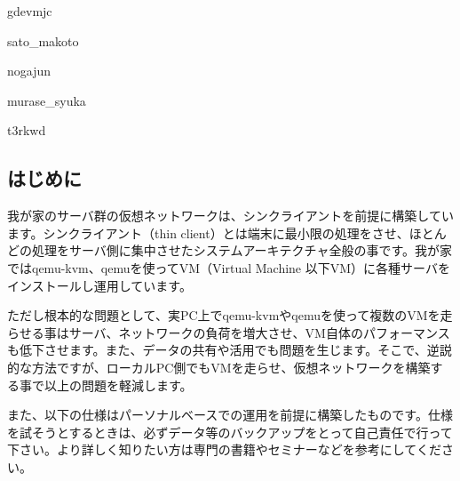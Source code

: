 \documentclass[mingoth,a4paper]{jsarticle}
\begin{document}
\begin{prework}{gdevmjc}
\end{prework}

\begin{prework}{sato\_makoto}
\end{prework}

\begin{prework}{nogajun}
\end{prework}

\begin{prework}{murase\_syuka}
\end{prework}

\begin{prework}{t3rkwd}
\end{prework}



\subsection{はじめに}
我が家のサーバ群の仮想ネットワークは、シンクライアントを前提に構築しています。シンクライアント（thin client）とは端末に最小限の処理をさせ、ほとんどの処理をサーバ側に集中させたシステムアーキテクチャ全般の事です。我が家ではqemu-kvm、qemuを使ってVM（Virtual Machine 以下VM）に各種サーバをインストールし運用しています。

ただし根本的な問題として、実PC上でqemu-kvmやqemuを使って複数のVMを走らせる事はサーバ、ネットワークの負荷を増大させ、VM自体のパフォーマンスも低下させます。また、データの共有や活用でも問題を生じます。そこで、逆説的な方法ですが、ローカルPC側でもVMを走らせ、仮想ネットワークを構築する事で以上の問題を軽減します。

また、以下の仕様はパーソナルベースでの運用を前提に構築したものです。仕様を試そうとするときは、必ずデータ等のバックアップをとって自己責任で行って下さい。より詳しく知りたい方は専門の書籍やセミナーなどを参考にしてください。
\end{document}
